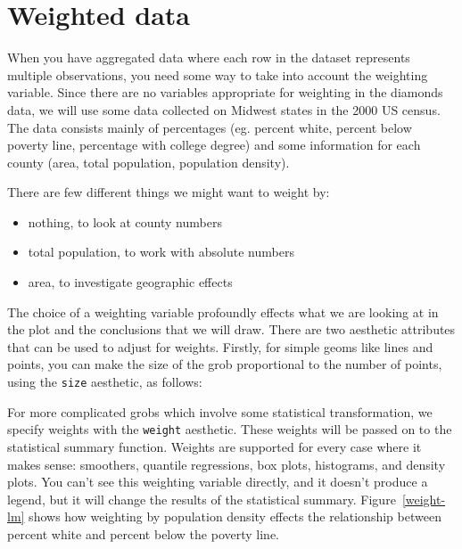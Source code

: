 

\section{Weighted data}
\label{sec:weighting}


When you have aggregated data where each row in the dataset represents multiple observations, you need some way to take into account the weighting variable.  Since there are no variables appropriate for weighting in the diamonds data, we will use some data collected on Midwest states in the 2000 US census.  The data consists mainly of percentages (eg. percent white, percent below poverty line, percentage with college degree) and some information for each county (area, total population, population density).

There are few different things we might want to weight by: 

\begin{itemize}
	\item nothing, to look at county numbers
	\item total population, to work with absolute numbers
	\item area, to investigate geographic effects
\end{itemize}

\noindent The choice of a weighting variable profoundly effects what we are looking at in the plot and the conclusions that we will draw.  There are two aesthetic attributes that can be used to adjust for weights.  Firstly, for simple geoms like lines and points, you can make the size of the grob proportional to the number of points, using the {\tt size} aesthetic, as follows:

%


For more complicated grobs which involve some statistical transformation, we specify weights with the {\tt weight} aesthetic.  These weights will be passed on to the statistical summary function.  Weights are supported for every case where it makes sense: smoothers, quantile regressions, box plots, histograms, and density plots.  You can't see this weighting variable directly, and it doesn't produce a legend, but it will change the results of the statistical summary.  Figure~\ref{weight-lm} shows how weighting by population density effects the relationship between percent white and percent below the poverty line.

